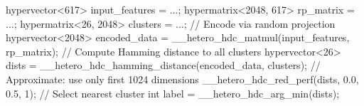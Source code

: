 hypervector<617> input_features = ...;
hypermatrix<2048, 617> rp_matrix = ...;
hypermatrix<26, 2048>  clusters = ...;
// Encode via random projection
hypervector<2048> encoded_data =
    __hetero_hdc_matmul(input_features, rp_matrix);
// Compute Hamming distance to all clusters
hypervector<26> dists =
    __hetero_hdc_hamming_distance(encoded_data, clusters);
// Approximate: use only first 1024 dimensions
__hetero_hdc_red_perf(dists, 0.0, 0.5, 1);
// Select nearest cluster
int label = __hetero_hdc_arg_min(dists);
